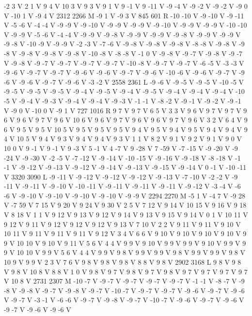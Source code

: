 {{-2 3 V
2 1 V
9 4 V
10 3 V
9 3 V
9 1 V
9 -1 V
9 -11 V
-9 -4 V
-9 -2 V
-9 -2 V
-9 0 V
-10 1 V
-9 4 V
2312 2266 M
-9 1 V
-9 3 V
845 601 R
-10 -10 V
-9 -10 V
-9 -11 V
-5 -6 V
-4 -4 V
-9 -9 V
-9 -10 V
-9 -9 V
-9 -9 V
-9 -10 V
-9 -9 V
-9 -9 V
-10 -10 V
-9 -9 V
-5 -6 V
-4 -4 V
-9 -9 V
-9 -8 V
-9 -9 V
-9 -9 V
-9 -8 V
-9 -9 V
-9 -9 V
-9 -8 V
-10 -9 V
-9 -9 V
-2 -3 V
-7 -6 V
-9 -8 V
-9 -8 V
-9 -8 V
-8 -8 V
-9 -8 V
-9 -8 V
-9 -8 V
-9 -8 V
-9 -8 V
-10 -8 V
-8 -8 V
-1 0 V
-9 -8 V
-9 -7 V
-9 -8 V
-9 -7 V
-9 -8 V
-9 -7 V
-9 -7 V
-9 -7 V
-9 -7 V
-10 -8 V
-9 -7 V
-9 -7 V
-6 -5 V
-3 -3 V
-9 -6 V
-9 -7 V
-9 -7 V
-9 -6 V
-9 -6 V
-9 -7 V
-9 -6 V
-10 -6 V
-9 -6 V
-9 -7 V
-9 -6 V
-9 -6 V
-9 -7 V
-9 -6 V
-3 -2 V
2558 2361 L
-9 -6 V
-9 -5 V
-9 -5 V
-10 -5 V
-9 -5 V
-9 -5 V
-9 -5 V
-9 -4 V
-9 -5 V
-9 -4 V
-9 -5 V
-9 -4 V
-9 -4 V
-9 -4 V
-10 -5 V
-9 -4 V
-9 -3 V
-9 -4 V
-9 -4 V
-9 -3 V
-1 -1 V
-8 -2 V
-9 -1 V
-9 -2 V
-9 -1 V
-9 0 V
-10 0 V
-9 1 V
727 1016 R
9 7 V
9 7 V
6 5 V
3 3 V
9 6 V
9 7 V
9 7 V
9 6 V
9 6 V
9 7 V
9 6 V
10 6 V
9 6 V
9 7 V
9 6 V
9 6 V
9 7 V
9 6 V
3 2 V
6 4 V
9 6 V
9 5 V
9 5 V
10 5 V
9 5 V
9 5 V
9 5 V
9 4 V
9 5 V
9 4 V
9 5 V
9 4 V
9 4 V
9 4 V
10 5 V
9 4 V
9 3 V
9 4 V
9 4 V
9 3 V
1 1 V
8 2 V
9 1 V
9 2 V
9 1 V
9 0 V
10 0 V
9 -1 V
9 -1 V
9 -3 V
5 -1 V
4 -7 V
9 -28 V
7 -59 V
-7 -15 V
-9 -20 V
-9 -24 V
-9 -30 V
-2 -5 V
-7 -12 V
-9 -14 V
-10 -15 V
-9 -16 V
-9 -18 V
-8 -18 V
-1 -1 V
-9 -12 V
-9 -13 V
-9 -12 V
-9 -14 V
-9 -13 V
-9 -15 V
-9 -14 V
0 -1 V
-10 -11 V
3320 3090 L
-9 -11 V
-9 -12 V
-9 -12 V
-9 -12 V
-9 -13 V
-7 -10 V
-2 -2 V
-9 -11 V
-9 -11 V
-9 -10 V
-10 -11 V
-9 -11 V
-9 -11 V
-9 -11 V
-9 -12 V
-3 -4 V
-6 -6 V
-9 -10 V
-9 -10 V
-9 -10 V
-9 -10 V
-9 -9 V
2294 2270 M
-5 1 V
-4 7 V
-9 28 V
-7 59 V
7 15 V
9 20 V
9 24 V
9 30 V
2 5 V
7 12 V
9 14 V
10 15 V
9 16 V
9 18 V
8 18 V
1 1 V
9 12 V
9 13 V
9 12 V
9 14 V
9 13 V
9 15 V
9 14 V
0 1 V
10 11 V
9 12 V
9 11 V
9 12 V
9 12 V
9 12 V
9 13 V
7 10 V
2 2 V
9 11 V
9 11 V
9 10 V
10 11 V
9 11 V
9 11 V
9 11 V
9 12 V
3 4 V
6 6 V
9 10 V
9 10 V
9 10 V
9 10 V
9 9 V
10 10 V
9 10 V
9 11 V
5 6 V
4 4 V
9 9 V
9 10 V
9 9 V
9 9 V
9 10 V
9 9 V
9 9 V
10 10 V
9 9 V
5 6 V
4 4 V
9 9 V
9 8 V
9 9 V
9 9 V
9 8 V
9 9 V
9 9 V
9 8 V
10 9 V
9 9 V
2 3 V
7 6 V
9 8 V
9 8 V
9 8 V
8 8 V
9 8 V
2902 3168 L
9 8 V
9 8 V
9 8 V
10 8 V
8 8 V
1 0 V
9 8 V
9 7 V
9 8 V
9 7 V
9 8 V
9 7 V
9 7 V
9 7 V
9 7 V
10 8 V
2731 2307 M
-10 -7 V
-9 -7 V
-9 -7 V
-9 -7 V
-9 -7 V
-1 -1 V
-8 -7 V
-9 -8 V
-9 -8 V
-9 -7 V
-9 -8 V
-9 -7 V
-10 -7 V
-9 -7 V
-9 -7 V
-9 -6 V
-9 -7 V
-9 -6 V
-9 -7 V
-3 -1 V
-6 -6 V
-9 -7 V
-9 -8 V
-9 -7 V
-10 -7 V
-9 -6 V
-9 -7 V
-9 -6 V
-9 -7 V
-9 -6 V
-9 -6 V
}}
